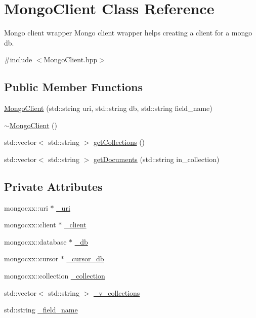 \hypertarget{class_mongo_client}{}\section{Mongo\+Client Class Reference}
\label{class_mongo_client}


Mongo client wrapper Mongo client wrapper helps creating a client for a mongo db.  




{\ttfamily \#include $<$Mongo\+Client.\+hpp$>$}

\subsection*{Public Member Functions}
\begin{DoxyCompactItemize}
\item 
\hyperlink{class_mongo_client_a99c002f0875bafe7c72147aaed9086c0}{Mongo\+Client} (std\+::string uri, std\+::string db, std\+::string field\+\_\+name)
\item 
\hyperlink{class_mongo_client_aecb48220a940f8782861573a8b5d8692}{$\sim$\+Mongo\+Client} ()
\item 
std\+::vector$<$ std\+::string $>$ \hyperlink{class_mongo_client_af6a3081ec6f89b3f60eb4412807b172c}{get\+Collections} ()
\item 
std\+::vector$<$ std\+::string $>$ \hyperlink{class_mongo_client_ad5a0b939338a63f5dacc665056c8b330}{get\+Documents} (std\+::string in\+\_\+collection)
\end{DoxyCompactItemize}
\subsection*{Private Attributes}
\begin{DoxyCompactItemize}
\item 
mongocxx\+::uri $\ast$ \hyperlink{class_mongo_client_a0d5c8e1f21ef69de175ab07d7f074a22}{\+\_\+uri}
\item 
mongocxx\+::client $\ast$ \hyperlink{class_mongo_client_a5219540804d9229ab6a1da001c26a068}{\+\_\+client}
\item 
mongocxx\+::database $\ast$ \hyperlink{class_mongo_client_a1c48eda1d75c705898a8c04608f3f434}{\+\_\+db}
\item 
mongocxx\+::cursor $\ast$ \hyperlink{class_mongo_client_acee6b5e0d56b6ce9b99d363b7dc9d414}{\+\_\+cursor\+\_\+db}
\item 
mongocxx\+::collection \hyperlink{class_mongo_client_a68d5a96bba159d62203881ad6cc01912}{\+\_\+collection}
\item 
std\+::vector$<$ std\+::string $>$ \hyperlink{class_mongo_client_a0fe1acf7025dfc3ddaea718c5ab03746}{\+\_\+v\+\_\+collections}
\item 
std\+::string \hyperlink{class_mongo_client_ab3ded8c67af64c8b6b7a0a52da53a40f}{\+\_\+field\+\_\+name}
\end{DoxyCompactItemize}


